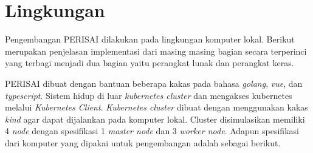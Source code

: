 \section{Lingkungan}
\label{sec:lingkungan-implementasi}
Pengembangan PERISAI dilakukan pada lingkungan komputer lokal. Berikut merupakan penjelasan implementasi dari masing masing bagian secara terperinci yang terbagi menjadi dua bagian yaitu perangkat lunak dan perangkat keras.

PERISAI dibuat dengan bantuan beberapa kakas pada bahasa \textit{golang}, \textit{vue}, dan \textit{typescript}. Sistem hidup di luar \textit{kubernetes cluster} dan mengakses kubernetes melalui \textit{Kubernetes Client}. \textit{Kubernetes cluster} dibuat dengan menggunakan kakas \textit{kind} agar dapat dijalankan pada komputer lokal. Cluster disimulasikan memiliki 4 \textit{node} dengan spesifikasi 1 \textit{master node} dan 3 \textit{worker node}. Adapun spesifikasi dari komputer yang dipakai untuk pengembangan adalah sebagai berikut.
